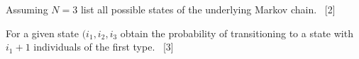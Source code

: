 \documentclass[12pt,a4paper]{article}
\makeatletter
\renewcommand{\@oddfoot}{\hfil \arabic{page} \hfil}    %
\makeatother
\begin{document}
\begin{enumerate}
\begin{enumerate}
            Assuming \(N=3\) list all possible states of the underlying Markov
            chain.
            ~\hfill{[2]}

            For a given state \((i_1, i_2, i_3\) obtain the probability of
            transitioning
            to a state with \(i_1 + 1\) individuals of the first type.
            ~\hfill{[3]}

    \end{enumerate}
\end{enumerate}


\makeatletter
\renewcommand{\@oddfoot}{\hfil \arabic{page}X \hfil}    %
\makeatother
\end{document}
